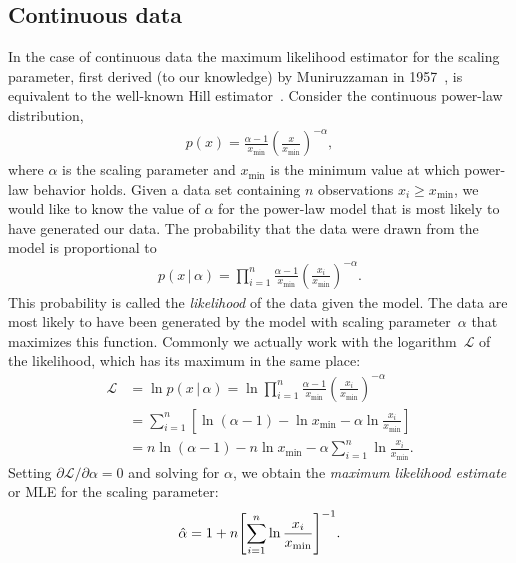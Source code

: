 \documentclass[final]{siamltex}
\newcommand{\xmin}{\ensuremath{x_{\min}}}
\newcommand{\Loglike}{\ensuremath{\mathcal{L}}}
\begin{document}
\begin{appendix}
\subsection{Continuous data}
In the case of continuous data the maximum likelihood estimator for the
scaling parameter, first derived (to our knowledge) by Muniruzzaman in
1957~\cite{Muniruzzaman-on-Pareto}, is equivalent to the well-known Hill
estimator~\cite{Hill75}.  Consider the continuous power-law distribution,
\begin{align}
\label{eq:cpl}
p(x) = \frac{\alpha-1}{\xmin}\left(\frac{x}{\xmin}  \right)^{-\alpha} ,
\end{align}
where $\alpha$ is the scaling parameter and $\xmin$ is the minimum value at
which power-law behavior holds.  Given a data set containing $n$
observations $x_i\geq \xmin$, we would like to know the value of $\alpha$
for the power-law model that is most likely to have generated our data.
The probability that the data were drawn from the model is proportional to
\begin{align}
 p(x\,|\,\alpha) = \prod_{i=1}^{n}
 \frac{\alpha-1}{\xmin}\left(\frac{x_{i}}{\xmin} \right)^{-\alpha} .
\end{align}
This probability is called the \emph{likelihood} of the data given the
model.  The data are most likely to have been generated by the model with
scaling parameter~$\alpha$ that maximizes this function.  Commonly we
actually work with the logarithm~$\mathcal{L}$ of the likelihood, which has
its maximum in the same place:
\begin{align}
\label{eq:loglike}
\Loglike &= \ln p(x\,|\,\alpha)
         = \ln \prod_{i=1}^{n} \frac{\alpha-1}{\xmin}
           \left(\frac{x_{i}}{\xmin}  \right)^{-\alpha} \nonumber\\
        &= \sum_{i=1}^{n} \left[ \ln(\alpha-1) - \ln \xmin
           - \alpha \ln \frac{x_{i}}{\xmin} \right] \nonumber\\
        &= n \ln(\alpha-1) - n \ln \xmin - \alpha
           \sum_{i=1}^{n}\ln \frac{x_{i}}{\xmin}.
\end{align}
Setting $\partial\Loglike/\partial\alpha=0$ and solving for $\alpha$, we
obtain the \emph{maximum likelihood estimate} or MLE for the scaling
parameter:
\begin{align}
\label{eq:cMLE}
\hat{\alpha} = 1 + n \Biggl[ \sum_{i=1}^n \ln {x_i\over \xmin}
              \Biggr]^{-1}.
\end{align}



\end{appendix}
\end{document}
